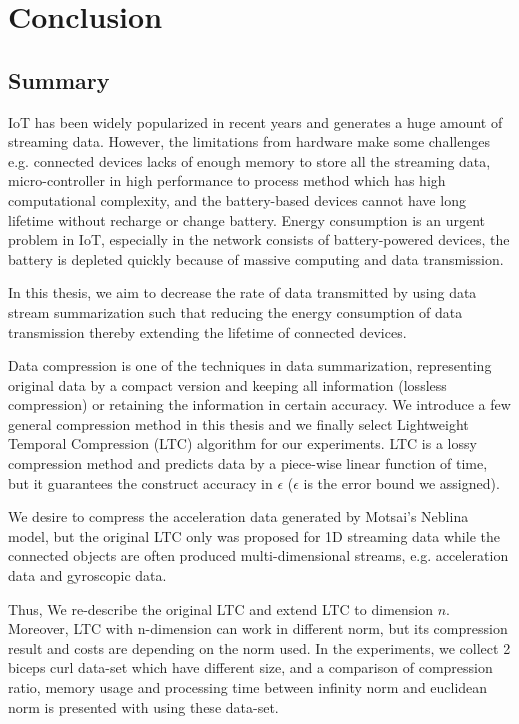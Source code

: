\chapter{Conclusion}



\section{Summary}


IoT has been widely popularized in recent years and generates a huge amount of
streaming data. However, the limitations from hardware make some challenges e.g.
connected devices lacks of enough memory to store all the streaming data,
micro-controller in high performance to process method which has high
computational complexity, and the battery-based devices cannot have long
lifetime without recharge or change battery. Energy consumption is an urgent
problem in IoT, especially in the network consists of battery-powered devices,
the battery is depleted quickly because of massive computing and data
transmission.

In this thesis, we aim to decrease the rate of data transmitted by using data
stream summarization such that reducing the energy consumption of data
transmission thereby extending the lifetime of connected devices. 

Data compression is one of the techniques in data summarization, representing
original data by a compact version and keeping all information (lossless
compression) or retaining the information in certain accuracy. We introduce a
few general compression method in this thesis and we finally select Lightweight
Temporal Compression (LTC) algorithm for our experiments. LTC is a lossy
compression method and predicts data by a piece-wise linear function of time,
but it guarantees the construct accuracy in $\epsilon$ ($\epsilon$ is the error
bound we assigned). 

We desire to compress the acceleration data generated by Motsai's Neblina model,
but the original LTC only was proposed for 1D streaming data while the connected
objects are often produced multi-dimensional streams, e.g. acceleration data and
gyroscopic data.

Thus, We re-describe the original LTC and extend LTC to dimension $n$. Moreover,
LTC with n-dimension can work in different norm, but its compression result and costs
are depending on the norm used. In the experiments, we collect 2 biceps curl
data-set which have different size, and a comparison of compression ratio,
memory usage and processing time between infinity norm and euclidean norm is
presented with using these data-set.  

